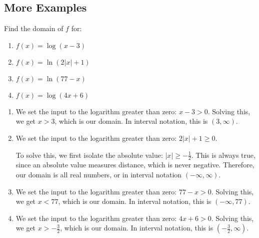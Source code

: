 \documentclass{ximera}
\begin{document}
\subsection{More Examples}
Find the domain of $f$ for:

\begin{enumerate}
	\item $f(x) = \log(x - 3)$
	\item $f(x) = \ln(2|x| + 1)$
	\item $f(x) = \ln(77 - x)$
	\item $f(x) = \log(4x + 6)$
\end{enumerate}

\begin{explanation}
\begin{enumerate}
	\item We set the input to the logarithm greater than zero: $x - 3 > 0$. Solving this, we get $x > 3$, which is our domain. In interval notation, this is $(3, \infty)$. 

	\item We set the input to the logarithm greater than zero: $2|x| + 1 \ge 0$.

To solve this, we first isolate the absolute value: $|x| \ge -\frac{1}{2}$. This is always true, since an absolute value measures distance, which is never negative. Therefore, our domain is all real numbers, or in interval notation $(-\infty, \infty)$.
	\item We set the input to the logarithm greater than zero: $77-x> 0$. Solving this, we get $x < 77$, which is our domain. In interval notation, this is $(-\infty, 77)$.   

	\item We set the input to the logarithm greater than zero: $4x + 6> 0$. Solving this, we get $x > -\frac{3}{2}$, which is our domain. In interval notation, this is $\left(-\frac{3}{2}, \infty\right)$. 
\end{enumerate}
\end{explanation}

\end{document}
